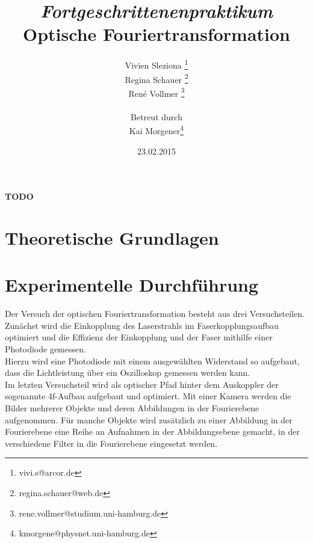 \documentclass[12pt,a4paper]{article}
\begin{document}
	
	\textbf{TODO}
	
	
	
	\title{\textit{Fortgeschrittenenpraktikum}\\\textbf{Optische Fouriertransformation} }
	\date{23.02.2015}
	\author{Vivien Sleziona \footnote{vivi.s@arcor.de}\\ Regina Schauer \footnote{regina.schauer@web.de}\\ René Vollmer \footnote{rene.vollmer@studium.uni-hamburg.de} \\ \\Betreut durch\\ Kai Morgener\footnote{kmorgene@physnet.uni-hamburg.de}}
	
	\maketitle
	
	\begin{center} 
		\bigskip
		\bigskip
		
		\begin{minipage}{0.75\textwidth}
			
		\end{minipage}
	\end{center}
	
	\newpage
	
	\tableofcontents
	\vfill
	\newpage
	\clearpage	
	
	
	\section{Theoretische Grundlagen}
	
	

	
	\newpage
	\clearpage
	
	\section{Experimentelle Durchführung}
		Der Versuch der optischen Fouriertransformation besteht aus drei Versuchsteilen. Zunächst wird die Einkopplung des Laserstrahls im Faserkopplungsaufbau optimiert und die Effizienz der Einkopplung und der Faser mithilfe einer Photodiode gemessen. \\
		Hierzu wird eine Photodiode mit einem ausgewählten Widerstand so aufgebaut, dass die Lichtleistung über ein Oszilloskop gemessen werden kann.\\
		Im letzten Versuchsteil wird als optischer Pfad hinter dem Auskoppler der sogenannte 4f-Aufbau aufgebaut und optimiert. Mit einer Kamera werden die Bilder mehrerer Objekte und deren Abbildungen in der Fourierebene aufgenommen. Für manche Objekte wird zusätzlich zu einer Abbildung in der Fourierebene eine Reihe an Aufnahmen in der Abbildungsebene gemacht, in der verschiedene Filter in die Fourierebene eingesetzt werden.   
		
\end{document}
